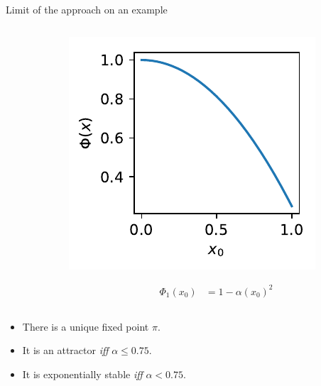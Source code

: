 \documentclass{beamer}
\begin{document}
\begin{frame}{Limit of the approach on an example}
  \begin{columns}
    \begin{column}{.4\linewidth}
    \end{column}
    \begin{column}{0.4\linewidth}
      \centering
      \includegraphics[width=.8\linewidth]{phi_unstable}
      \vspace{-1cm}
      
      \begin{align*}
        \Phi_1(x_0) &= 1-\alpha (x_0)^2
      \end{align*}
    \end{column}
  \end{columns}
  \bigskip\bigskip
  
  \begin{itemize}
  \item There is a unique fixed point $\pi$. 
  \item It is an attractor \emph{iff} $\alpha\le0.75$. 
  \item It is exponentially stable \emph{iff} $\alpha<0.75$. 
  \end{itemize}
\end{frame}
\end{document}
